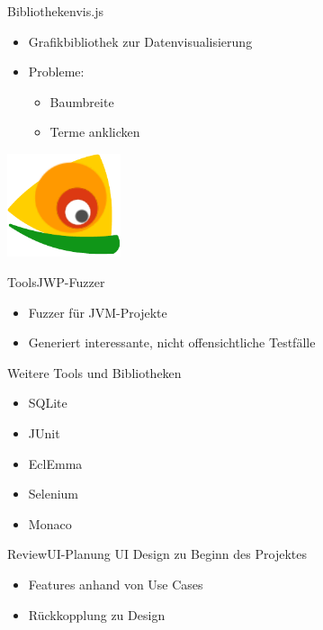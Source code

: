\documentclass[10pt]{beamer}
\begin{document}
\begin{frame}{Bibliotheken}{vis.js}
	\begin{itemize}
		\item Grafikbibliothek zur Datenvisualisierung
		\item Probleme: 
			\begin{itemize}
				\item{Baumbreite}
				\item{Terme anklicken}
			\end{itemize}
	\end{itemize}
	\vspace{2.8cm}
    \hfill\includegraphics[width = 0.25\textwidth]{img/vis-cropped}
\end{frame}

\begin{frame}{Tools}{JWP-Fuzzer}
	\begin{itemize}
		\item Fuzzer für JVM-Projekte
		\item Generiert interessante, nicht offensichtliche Testfälle
	\end{itemize}
\end{frame}


\begin{frame}{Weitere Tools und Bibliotheken}{}
	\begin{itemize}
		\item SQLite
		\item JUnit
		\item EclEmma
		\item Selenium
		\item Monaco
	\end{itemize}
\end{frame}


\begin{frame}{Review}{UI-Planung}
UI Design zu Beginn des Projektes
	\begin{itemize}
		\item Features anhand von Use Cases
		\item Rückkopplung zu Design
	\end{itemize}
\end{frame}
\end{document}
